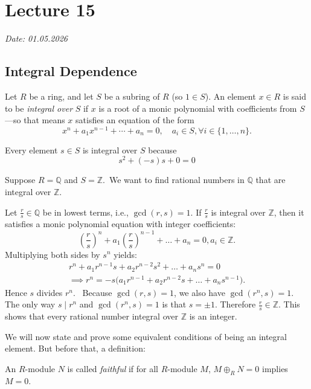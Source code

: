 \chapter{Lecture 15}

\hfill {\footnotesize \emph{Date: 01.05.2026}}

\section{Integral Dependence}

Let \( R \) be a ring, and let  \( S \) be a subring of  \( R \) (so \( 1 \in S\)). An element \( x \in R \) is said to be  \emph{integral over }\( S \) if  \( x \) is a root of a monic polynomial with coefficients from  \( S \)---so that means  \( x \) satisfies an equation of the form
 \[
   x^n + a_1x^{n-1} + \cdots + a_n = 0, \quad a_i \in S, \forall i \in \{1, \ldots, n\}.
\]
\begin{remark}
  Every element \( s \in S \) is integral over \( S \) because 
  \[
  s^2 + (-s)s + 0 = 0
  \]
\end{remark}
\begin{example}\label{ex:integralclosureZ}
  Suppose \(R = \mathbb{Q}\) and \(S = \mathbb{Z}\). We want to find rational numbers in \(\mathbb{Q}\) that are integral over \(\mathbb{Z}\).

  Let \(\frac{r}{s} \in \mathbb{Q}\) be in lowest terms, i.e., \(\gcd(r,s)=1\). If \(\frac{r}{s}\) is integral over \(\mathbb{Z}\), then it satisfies a monic polynomial equation with integer coefficients:
\[
\left(\frac{r}{s}\right)^{\!n} + a_1\left(\frac{r}{s}\right)^{\!n-1} + \dots + a_n = 0, a_i \in \mathbb{Z}.
\]
Multiplying both sides by \(s^n\) yields:
\begin{gather*}
  r^n + a_1 r^{n-1} s + a_2 r^{n-2} s^2 + \dots + a_n s^n = 0\\
  \implies r^n = -s\bigl(a_1 r^{n-1} + a_2 r^{n-2} s + \dots + a_n s^{n-1}\bigr).
\end{gather*}
Hence \(s\) divides \(r^n\).  Because \(\gcd(r,s)=1\), we also have \(\gcd(r^n,s)=1\).  The only way \(s \mid r^n\) and \(\gcd(r^n,s)=1\) is that \(s = \pm 1\). Therefore \(\frac{r}{s} \in \mathbb{Z}\). This shows that every rational number integral over \(\mathbb{Z}\) is an integer.
\end{example}
We will now state and prove some equivalent conditions of being an integral element. But before that, a definition: 
\begin{definition}
  An \( R \)-module  \( N \) is called  \emph{faithful} if for all \( R \)-module  \( M \), \( M \oplus_R N = 0 \) implies  \( M = 0 \).
\end{definition}
